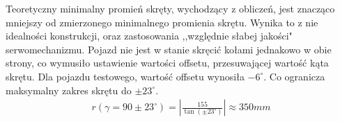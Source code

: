             Teoretyczny minimalny promień skręty, wychodzący z obliczeń, jest znacząco mniejszy od zmierzonego minimalnego promienia skrętu.
            Wynika to z nie idealności konstrukcji, oraz zastosowania ,,względnie słabej jakości" serwomechanizmu.
            Pojazd nie jest w stanie skręcić kołami jednakowo w obie strony, co wymusiło ustawienie wartości offsetu, przesuwającej wartość kąta skrętu.
            Dla pojazdu testowego, wartość offsetu wynosiła $-6^\circ$. 
            Co ogranicza maksymalny zakres skrętu do $\pm 23^\circ$.
            \begin{gather}
                r(\gamma = 90 \pm 23^\circ) = \left|\frac{155}{\tan(\pm 23^\circ)}\right| \approx 350mm
            \end{gather}


